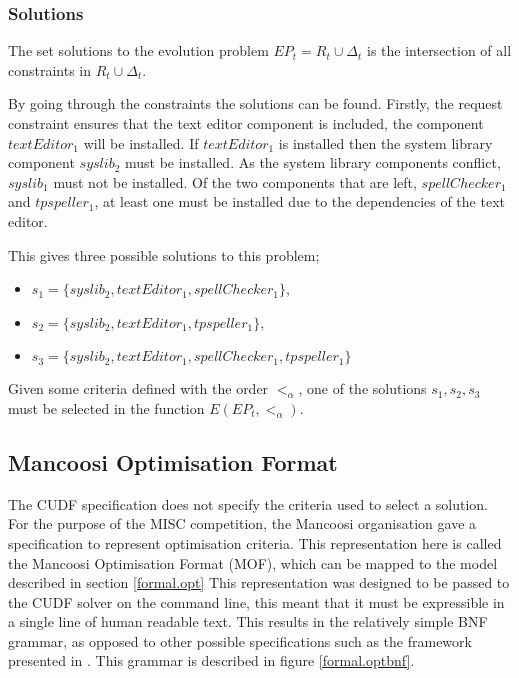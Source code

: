 \subsubsection{Solutions}
The set solutions to the evolution problem $EP_t = R_t \cup \Delta_t$ is the intersection of all constraints in $R_t \cup \Delta_t$.

By going through the constraints the solutions can be found.
Firstly, the request constraint ensures that the text editor component is included, the component $textEditor_1$ will be installed.
If $textEditor_1$ is installed then the system library component $syslib_2$ must be installed.
As the system library components conflict, $syslib_1$ must not be installed.
Of the two components that are left, $spellChecker_1$ and $tpspeller_1$, at least one must be installed due to the dependencies of the text editor.

This gives three possible solutions to this problem;
\begin{itemize}
  \item $s_1 = \{syslib_2, textEditor_1, spellChecker_1\}$,
  \item $s_2 = \{syslib_2, textEditor_1, tpspeller_1\}$,
  \item $s_3 = \{syslib_2, textEditor_1, spellChecker_1, tpspeller_1\}$
\end{itemize}

Given some criteria defined with the order $<_{\alpha}$, one of the solutions $s_1,s_2,s_3$ must be selected in the function $E(EP_t,<_{\alpha})$. 

\subsection{Mancoosi Optimisation Format}
\label{formal.mancoosioptimisationformat}
The CUDF specification does not specify the criteria used to select a solution.
For the purpose of the MISC competition, the Mancoosi organisation gave a specification to represent optimisation criteria.
This representation here is called the Mancoosi Optimisation Format (MOF), which can be mapped to the model described in section \ref{formal.opt}
This representation was designed to be passed to the CUDF solver on the command line, this meant that it must be expressible in a single line of human readable text.
This results in the relatively simple BNF grammar, as opposed to other possible specifications such as the framework presented in \citep{Treinen2009}. 
This grammar is described in figure \ref{formal.optbnf}.

